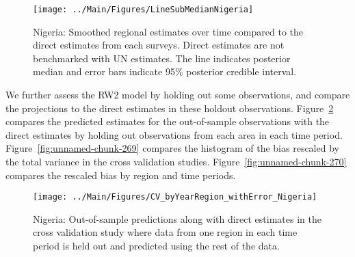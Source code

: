 \documentclass[12pt]{article}\usepackage[]{graphicx}\usepackage[]{color}
\newenvironment{knitrout}{}{} %
\begin{document}
\begin{knitrout}
\color{fgcolor}\begin{figure}[bht]

{\centering \texttt{[image: ../Main/Figures/LineSubMedianNigeria]} 

}

\caption[Nigeria]{Nigeria: Smoothed regional estimates over time compared to the direct estimates from each surveys. Direct estimates are not benchmarked with UN estimates. The line indicates posterior median and error bars indicate 95\% posterior credible interval.}\label{fig:unnamed-chunk-267}
\end{figure}


\end{knitrout}
We further assess the RW2 model by holding out some observations, and compare the projections to the direct estimates in these holdout observations. Figure~\ref{fig:unnamed-chunk-268} compares the predicted estimates for the out-of-sample observations  with the direct estimates by holding out observations from each area in each time period.  Figure~\ref{fig:unnamed-chunk-269} compares the histogram of the bias rescaled by the total variance in the cross validation studies. Figure~\ref{fig:unnamed-chunk-270} compares the rescaled bias by region and time periods.



 
\begin{knitrout}
\color{fgcolor}\begin{figure}[bht]

{\centering \texttt{[image: ../Main/Figures/CV\_byYearRegion\_withError\_Nigeria]} 

}

\caption[Nigeria]{Nigeria: Out-of-sample predictions along with direct estimates in the cross validation study where data from one region in each time period is held out and predicted using the rest of the data.}\label{fig:unnamed-chunk-268}
\end{figure}


\end{knitrout}
\end{document}
